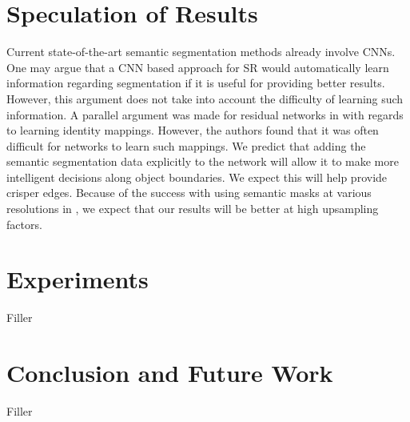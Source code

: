 \documentclass[10pt,twocolumn,letterpaper]{article}
\begin{document}

\section{Speculation of Results}
Current state-of-the-art semantic segmentation methods already involve CNNs.
One may argue that a CNN based approach for SR would automatically learn
information regarding segmentation if it is useful for providing better
results. However, this argument does not take into account the difficulty of
learning such information. A parallel argument was made for residual networks
in \cite{ResNet} with regards to learning identity mappings. However, the
authors found that it was often difficult for networks to learn such mappings.
We predict that adding the semantic segmentation data explicitly to the network
will allow it to make more intelligent decisions along object boundaries. We
expect this will help provide crisper edges. Because of the success with using
semantic masks at various resolutions in \cite{ImageSynthesis}, we expect that
our results will be better at high upsampling factors.

\section{Experiments}
Filler

\section{Conclusion and Future Work}
\label{sec:conclusion}

Filler

{\small


}
\end{document}
